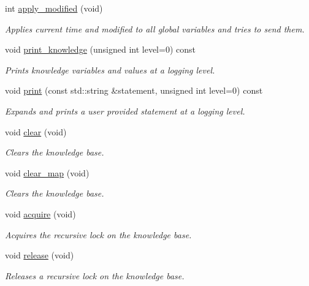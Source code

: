 \begin{DoxyCompactItemize}
int \hyperlink{classMadara_1_1Knowledge__Engine_1_1Knowledge__Base_a7bd62f59f791c41d4ff82b467187de29}{apply\_\-modified} (void)
\begin{DoxyCompactList}\small\item\em Applies current time and modified to all global variables and tries to send them. \item\end{DoxyCompactList}\item 
void \hyperlink{classMadara_1_1Knowledge__Engine_1_1Knowledge__Base_a6f53172febf5dd225e5a51349dcf78aa}{print\_\-knowledge} (unsigned int level=0) const 
\begin{DoxyCompactList}\small\item\em Prints knowledge variables and values at a logging level. \item\end{DoxyCompactList}\item 
void \hyperlink{classMadara_1_1Knowledge__Engine_1_1Knowledge__Base_ade6fa720afe6649f2c8809014ff7ee84}{print} (const std::string \&statement, unsigned int level=0) const 
\begin{DoxyCompactList}\small\item\em Expands and prints a user provided statement at a logging level. \item\end{DoxyCompactList}\item 
void \hyperlink{classMadara_1_1Knowledge__Engine_1_1Knowledge__Base_ac10a0980da9449e950f0505d213e7a7a}{clear} (void)
\begin{DoxyCompactList}\small\item\em Clears the knowledge base. \item\end{DoxyCompactList}\item 
void \hyperlink{classMadara_1_1Knowledge__Engine_1_1Knowledge__Base_a8c0717d5eeddd03190a54a42b4e288e5}{clear\_\-map} (void)
\begin{DoxyCompactList}\small\item\em Clears the knowledge base. \item\end{DoxyCompactList}\item 
void \hyperlink{classMadara_1_1Knowledge__Engine_1_1Knowledge__Base_ad4a669ec01f83c7f5b59bf067d8953d3}{acquire} (void)
\begin{DoxyCompactList}\small\item\em Acquires the recursive lock on the knowledge base. \item\end{DoxyCompactList}\item 
void \hyperlink{classMadara_1_1Knowledge__Engine_1_1Knowledge__Base_a1b85a0ab0625f95e52c63c75862ee319}{release} (void)
\begin{DoxyCompactList}\small\item\em Releases a recursive lock on the knowledge base. \item\end{DoxyCompactList}\end{DoxyCompactItemize}
